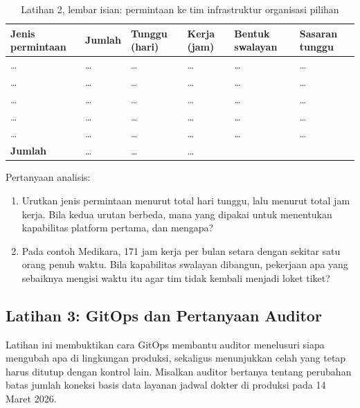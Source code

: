 \begin{table}[!htb]
  \centering
  \caption{Latihan 2, lembar isian: permintaan ke tim infrastruktur organisasi pilihan}
  \label{tab:ch13-lat2-hasil}
  \footnotesize
  \begin{tabularx}{\textwidth}{>{\raggedright\arraybackslash}p{2.6cm} >{\raggedleft\arraybackslash}p{1.0cm} >{\raggedleft\arraybackslash}p{1.2cm} >{\raggedleft\arraybackslash}p{1.1cm} >{\raggedright\arraybackslash}X >{\raggedright\arraybackslash}p{1.4cm}}
    \hline
    \textbf{Jenis permintaan} & \textbf{Jumlah} & \textbf{Tunggu (hari)} & \textbf{Kerja (jam)} &
      \textbf{Bentuk swalayan} & \textbf{Sasaran tunggu} \\ \hline
    \dots & \dots & \dots & \dots & \dots & \dots \\ \hline
    \dots & \dots & \dots & \dots & \dots & \dots \\ \hline
    \dots & \dots & \dots & \dots & \dots & \dots \\ \hline
    \dots & \dots & \dots & \dots & \dots & \dots \\ \hline
    \dots & \dots & \dots & \dots & \dots & \dots \\ \hline
    \textbf{Jumlah} & \dots & \dots & \dots & & \\ \hline
  \end{tabularx}
\end{table}

Pertanyaan analisis:
\begin{enumerate}
  \item Urutkan jenis permintaan menurut total hari tunggu, lalu menurut total jam kerja. Bila
        kedua urutan berbeda, mana yang dipakai untuk menentukan kapabilitas platform pertama, dan
        mengapa?
  \item Pada contoh Medikara, 171 jam kerja per bulan setara dengan sekitar satu orang penuh
        waktu. Bila kapabilitas swalayan dibangun, pekerjaan apa yang sebaiknya mengisi waktu
        itu agar tim tidak kembali menjadi loket tiket?
\end{enumerate}

\subsection*{Latihan 3: GitOps dan Pertanyaan Auditor}

Latihan ini membuktikan cara GitOps membantu auditor menelusuri siapa mengubah apa di lingkungan
produksi, sekaligus menunjukkan celah yang tetap harus ditutup dengan kontrol lain. Misalkan
auditor bertanya tentang perubahan batas jumlah koneksi basis data layanan jadwal dokter di
produksi pada 14 Maret 2026.

